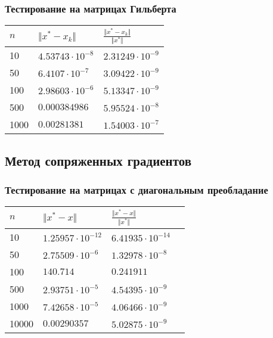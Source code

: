 \documentclass[english]{article}
\begin{document}
\subsubsection{Тестирование на матрицах Гильберта}
\begin{center}
  \begin{longtable}{l|l|l}
    \(n\) & \(\Vert x^* - x_k \Vert\) & \(\frac{\Vert x^* - x_k \Vert}{\Vert x^* \Vert}\) \\
    \hline
    10 & \(4.53743\cdot 10^{-8}\) & \(2.31249\cdot 10^{-9}\) \\
    50 & \(6.4107\cdot 10^{-7} \) & \(3.09422\cdot 10^{-9}\) \\
    100 & \(2.98603\cdot 10^{-6}\) & \(5.13347\cdot 10^{-9}\) \\
    500 & \(0.000384986\) & \(5.95524\cdot 10^{-8}\) \\
    1000 & \(0.00281381 \) & \(1.54003\cdot 10^{-7}\)
  \end{longtable}
\end{center}
\subsection{Метод сопряженных градиентов}
\subsubsection{Тестирование на матрицах с диагональным преобладание}
\begin{center}
  \begin{longtable}{l|l|l|l}
    \(n\) & \(\Vert x^* - x \Vert\) & \(\frac{\Vert x^* - x \Vert}{\Vert x^* \Vert}\) \\
    \hline
    10 & \(1.25957\cdot 10^{-12}\) & \(6.41935\cdot 10^{-14}\) \\
    50 & \(2.75509\cdot 10^{-6}\) & \(1.32978\cdot 10^{-8}\) \\
    100 & \(140.714\) & \(0.241911\) \\
    500 & \(2.93751\cdot 10^{-5}\) & \(4.54395\cdot 10^{-9}\) \\
    1000 & \(7.42658\cdot 10^{-5}\) & \(4.06466\cdot 10^{-9}\) \\
    10000 & \(0.00290357\) & \(5.02875\cdot 10^{-9}\) \\
  \end{longtable}
\end{center}
\end{document}
